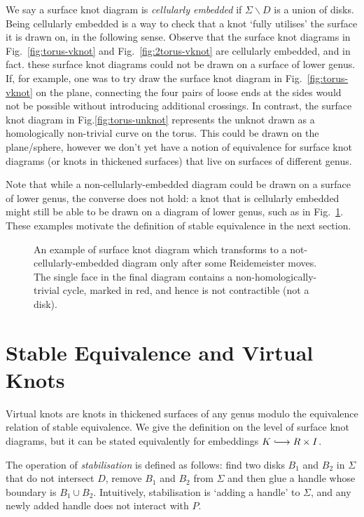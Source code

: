 \documentclass[12pt]{report}
\newcommand{\inject}{\lhook\joinrel\longrightarrow}
\theoremstyle{upright}
\begin{document}
We say a surface knot diagram is \textit{cellularly embedded} if $\Sigma \smallsetminus D$ is a union of disks. Being cellularly embedded is a way to check that a knot `fully utilises' the surface it is drawn on, in the following sense. Observe that the surface knot diagrams in Fig.~\ref{fig:torus-vknot} and Fig.~\ref{fig:2torus-vknot} are cellularly embedded, and in fact. these surface knot diagrams could not be drawn on a surface of lower genus. If, for example, one was to try draw the surface knot diagram in Fig.~\ref{fig:torus-vknot} on the plane, connecting the four pairs of loose ends at the sides would not be possible without introducing additional crossings. In contrast, the surface knot diagram in Fig.\ref{fig:torus-unknot} represents the unknot drawn as a homologically non-trivial curve on the torus. This could be drawn on the plane/sphere, however we don't yet have a notion of equivalence for surface knot diagrams (or knots in thickened surfaces) that live on surfaces of different genus.

Note that while a non-cellularly-embedded diagram could be drawn on a surface of lower genus, the converse does not hold: a knot that is cellularly embedded might still be able to be drawn on a diagram of lower genus, such as in Fig.~\ref{fig:cellular-embedding-tricky}. These examples motivate the definition of stable equivalence in the next section.

\begin{figure}[hbt!]
	\centering
	\def\svgscale{0.56}
	
	
	\caption{An example of surface knot diagram which transforms to a not-cellularly-embedded diagram only after some Reidemeister moves. The single face in the final diagram contains a non-homologically-trivial cycle, marked in red, and hence is not contractible (not a disk).}
	\label{fig:cellular-embedding-tricky}
\end{figure}

\section{Stable Equivalence and Virtual Knots}

Virtual knots are knots in thickened surfaces of any genus modulo the equivalence relation of stable equivalence. We give the definition on the level of surface knot diagrams, but it can be stated equivalently for embeddings $K \inject R \times I$.

The operation of \textit{stabilisation} is defined as follows: find two disks $B_{1}$ and $B_{2}$ in $\Sigma$ that do not intersect $D$, remove $B_{1}$ and $B_{2}$ from $\Sigma$ and then glue a handle whose boundary is $B_{1} \cup B_{2}$. Intuitively, stabilisation is `adding a handle' to $\Sigma$, and any newly added handle does not interact with $P$.
\end{document}
